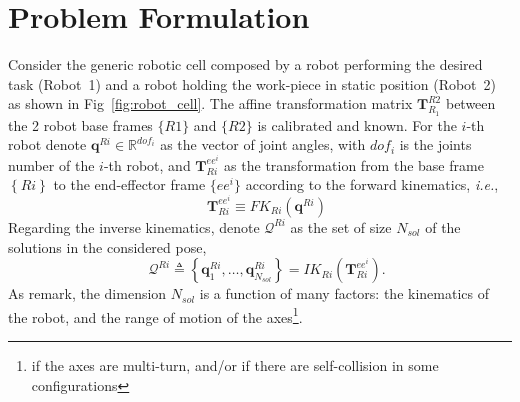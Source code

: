 \documentclass[twocolumn]{svjour3}
\newcommand{\R}[1]{R#1}
\newcommand{\Ri}{\R{i}}
\newcommand{\RA}{\R{1}}
\newcommand{\RB}{\R{2}}
\newcommand{\qri}{\mathbf{q}^{\Ri}}
\newcommand{\qqri}{\mathcal{Q}^{\Ri}}
\newcommand{\Tr}[2]{\mathbf{T}^{#2}_{#1}}
\begin{document}

\section{Problem Formulation}
\label{sec:problem}

Consider the generic robotic cell composed by a robot performing the desired task (Robot~1) and a robot holding the work-piece in static position (Robot~2) as shown in Fig~\ref{fig:robot_cell}. The affine transformation matrix $\Tr{R_1}{\RB}$ between the 2 robot base frames $\{\RA\}$ and $\{\RB\}$ is calibrated and known. For the $i$-th robot denote $\qri \in \mathbb{R}^{dof_i}$ as the vector of joint angles, with $dof_i$ is the joints number of the $i$-th robot, and $\Tr{\Ri}{ee^i}$ as the transformation from the base frame $\left\{\Ri\right\}$ to the end-effector frame $\{ee^i\}$ according to the forward kinematics, \textit{i.e.}, 
\begin{equation}
    \quad\Tr{\Ri}{ee^i}\equiv FK_{\Ri}\left(\qri\right)
\end{equation}
Regarding the inverse kinematics, denote $\qqri$ as the set of size $N_{sol}$ of the solutions in the considered pose, 
\begin{equation}
    \quad\qqri  \triangleq\left\{\qri_{1}, \ldots, \qri_{N_{sol}} \right\} = IK_{\Ri}\left(\Tr{\Ri}{ee^i}\right).
\end{equation}
As remark, the dimension $N_{sol}$ is a function of many factors: the kinematics of the robot, and the range of motion of the axes\footnote{if the axes are multi-turn, and/or if there are self-collision in some configurations}. 
\end{document}
